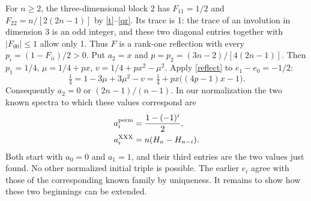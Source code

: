 \documentclass[11pt]{article}
\begin{document}
For $n\ge2$, the three-dimensional block 2 has $F_{11}=1/2$ and $F_{22}=n/[2(2n-1)]$ by \eqref{t}--\eqref{qr}. Its trace is 1: the trace of an involution in dimension 3 is an odd integer, and these two diagonal entries together with $|F_{00}|\le1$ allow only 1. Thus $F$ is a rank-one reflection with every $p_i=(1-F_{ii})/2>0$. Put $a_2=x$ and $p=p_2=(3n-2)/[4(2n-1)]$. Then $p_1=1/4$, $\mu=1/4+px$, $v=1/4+px^2-\mu^2$. Apply \eqref{reflect} to $e_1-e_0=-1/2$:
\[
 \tfrac14=1-3\mu+3\mu^2-v
 =\tfrac14+px\big((4p-1)x-1\big).
\]
Consequently $a_2=0$ or $(2n-1)/(n-1)$. In our normalization the two known spectra to which these values correspond are
\begin{align*}
 a_i^{\rm perm}&=\frac{1-(-1)^i}{2},\\
 a_i^{\rm XXX}&=n(H_n-H_{n-i}).
\end{align*}
Both start with $a_0=0$ and $a_1=1$, and their third entries are the two values just found. No other normalized initial triple is possible. The earlier $e_i$ agree with those of the corresponding known family by uniqueness. It remains to show how these two beginnings can be extended.
\end{document}
